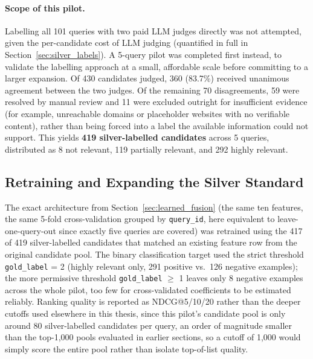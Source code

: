 \documentclass[a4paper,oneside,bibliography=totoc]{scrbook}
\begin{document}
\paragraph{Scope of this pilot.} Labelling all 101 queries with two paid LLM judges directly was not attempted, given the per-candidate cost of LLM judging (quantified in full in Section~\ref{sec:silver_labels}). A 5-query pilot was completed first instead, to validate the labelling approach at a small, affordable scale before committing to a larger expansion. Of 430 candidates judged, 360 (83.7\%) received unanimous agreement between the two judges. Of the remaining 70 disagreements, 59 were resolved by manual review and 11 were excluded outright for insufficient evidence (for example, unreachable domains or placeholder websites with no verifiable content), rather than being forced into a label the available information could not support. This yields \textbf{419 silver-labelled candidates} across 5 queries, distributed as 8 not relevant, 119 partially relevant, and 292 highly relevant.

\subsection{Retraining and Expanding the Silver Standard}
\label{subsec:refit_fusion_ranker}

The exact architecture from Section~\ref{sec:learned_fusion} (the same ten features, the same 5-fold cross-validation grouped by \texttt{query\_id}, here equivalent to leave-one-query-out since exactly five queries are covered) was retrained using the 417 of 419 silver-labelled candidates that matched an existing feature row from the original candidate pool. The binary classification target used the strict threshold \texttt{gold\_label} = 2 (highly relevant only, 291 positive vs.\ 126 negative examples); the more permissive threshold \texttt{gold\_label} $\geq$ 1 leaves only 8 negative examples across the whole pilot, too few for cross-validated coefficients to be estimated reliably. Ranking quality is reported as NDCG@5/10/20 rather than the deeper cutoffs used elsewhere in this thesis, since this pilot's candidate pool is only around 80 silver-labelled candidates per query, an order of magnitude smaller than the top-1{,}000 pools evaluated in earlier sections, so a cutoff of 1{,}000 would simply score the entire pool rather than isolate top-of-list quality.

\label{sec:silver_labels}
\end{document}
